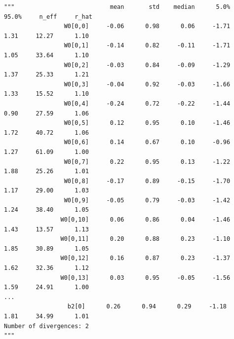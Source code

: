 \documentclass{article}
\begin{document}
\begin{lstlisting}[caption= {Results of Inference with HMC},captionpos=t]
"""                           mean       std    median      5.0%     95.0%     n_eff     r_hat
                 W0[0,0]     -0.06      0.98      0.06     -1.71      1.31     12.27      1.10
                 W0[0,1]     -0.14      0.82     -0.11     -1.71      1.05     33.64      1.10
                 W0[0,2]     -0.03      0.84     -0.09     -1.29      1.37     25.33      1.21
                 W0[0,3]     -0.04      0.92     -0.03     -1.66      1.33     15.52      1.10
                 W0[0,4]     -0.24      0.72     -0.22     -1.44      0.90     27.59      1.06
                 W0[0,5]      0.12      0.95      0.10     -1.46      1.72     40.72      1.06
                 W0[0,6]      0.14      0.67      0.10     -0.96      1.27     61.09      1.00
                 W0[0,7]      0.22      0.95      0.13     -1.22      1.88     25.26      1.01
                 W0[0,8]     -0.17      0.89     -0.15     -1.70      1.17     29.00      1.03
                 W0[0,9]     -0.05      0.79     -0.03     -1.42      1.24     38.40      1.05
                W0[0,10]      0.06      0.86      0.04     -1.46      1.43     13.57      1.13
                W0[0,11]      0.20      0.88      0.23     -1.10      1.85     30.89      1.05
                W0[0,12]      0.16      0.87      0.23     -1.37      1.62     32.36      1.12
                W0[0,13]      0.03      0.95     -0.05     -1.56      1.59     24.91      1.00
...
                  b2[0]      0.26      0.94      0.29     -1.18      1.81     34.99      1.01
Number of divergences: 2
"""
\end{lstlisting}
\end{document}
